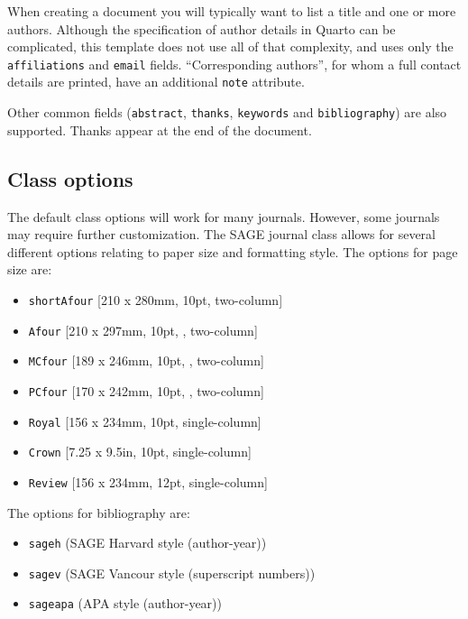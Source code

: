 \documentclass[
  Afour,
  times,
  sageh]{sagej}
\providecommand{\tightlist}{%
  \setlength{\itemsep}{0pt}\setlength{\parskip}{0pt}}
\begin{document}
When creating a document you will typically want to list a title and one
or more authors. Although the specification of author details in Quarto
can be complicated, this template does not use all of that complexity,
and uses only the \texttt{affiliations} and \texttt{email} fields.
``Corresponding authors'', for whom a full contact details are printed,
have an additional \texttt{note} attribute.

Other common fields (\texttt{abstract}, \texttt{thanks},
\texttt{keywords} and \texttt{bibliography}) are also supported. Thanks
appear at the end of the document.

\hypertarget{class-options}{%
\subsection{Class options}\label{class-options}}

The default class options will work for many journals. However, some
journals may require further customization. The SAGE journal class
allows for several different options relating to paper size and
formatting style. The options for page size are:

\begin{itemize}
\tightlist
\item
  \texttt{shortAfour} {[}210 x 280mm, 10pt, two-column{]}
\item
  \texttt{Afour} {[}210 x 297mm, 10pt, , two-column{]}
\item
  \texttt{MCfour} {[}189 x 246mm, 10pt, , two-column{]}
\item
  \texttt{PCfour} {[}170 x 242mm, 10pt, , two-column{]}
\item
  \texttt{Royal} {[}156 x 234mm, 10pt, single-column{]}
\item
  \texttt{Crown} {[}7.25 x 9.5in, 10pt, single-column{]}
\item
  \texttt{Review} {[}156 x 234mm, 12pt, single-column{]}
\end{itemize}

The options for bibliography are:

\begin{itemize}
\tightlist
\item
  \texttt{sageh} (SAGE Harvard style (author-year))
\item
  \texttt{sagev} (SAGE Vancour style (superscript numbers))
\item
  \texttt{sageapa} (APA style (author-year))
\end{itemize}
\end{document}
